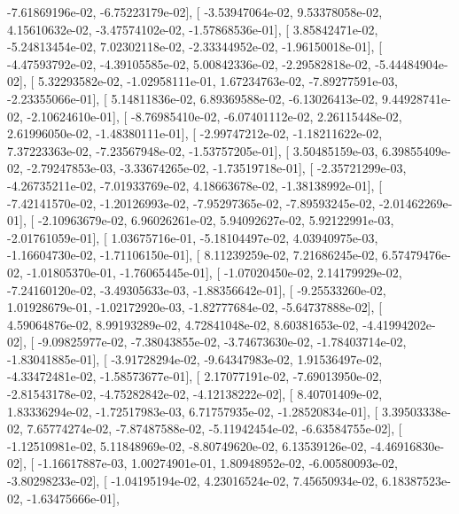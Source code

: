 \documentclass{article}
\begin{document}
         -7.61869196e-02,  -6.75223179e-02],
       [ -3.53947064e-02,   9.53378058e-02,   4.15610632e-02,
         -3.47574102e-02,  -1.57868536e-01],
       [  3.85842471e-02,  -5.24813454e-02,   7.02302118e-02,
         -2.33344952e-02,  -1.96150018e-01],
       [ -4.47593792e-02,  -4.39105585e-02,   5.00842336e-02,
         -2.29582818e-02,  -5.44484904e-02],
       [  5.32293582e-02,  -1.02958111e-01,   1.67234763e-02,
         -7.89277591e-03,  -2.23355066e-01],
       [  5.14811836e-02,   6.89369588e-02,  -6.13026413e-02,
          9.44928741e-02,  -2.10624610e-01],
       [ -8.76985410e-02,  -6.07401112e-02,   2.26115448e-02,
          2.61996050e-02,  -1.48380111e-01],
       [ -2.99747212e-02,  -1.18211622e-02,   7.37223363e-02,
         -7.23567948e-02,  -1.53757205e-01],
       [  3.50485159e-03,   6.39855409e-02,  -2.79247853e-03,
         -3.33674265e-02,  -1.73519718e-01],
       [ -2.35721299e-03,  -4.26735211e-02,  -7.01933769e-02,
          4.18663678e-02,  -1.38138992e-01],
       [ -7.42141570e-02,  -1.20126993e-02,  -7.95297365e-02,
         -7.89593245e-02,  -2.01462269e-01],
       [ -2.10963679e-02,   6.96026261e-02,   5.94092627e-02,
          5.92122991e-03,  -2.01761059e-01],
       [  1.03675716e-01,  -5.18104497e-02,   4.03940975e-03,
         -1.16604730e-02,  -1.71106150e-01],
       [  8.11239259e-02,   7.21686245e-02,   6.57479476e-02,
         -1.01805370e-01,  -1.76065445e-01],
       [ -1.07020450e-02,   2.14179929e-02,  -7.24160120e-02,
         -3.49305633e-03,  -1.88356642e-01],
       [ -9.25533260e-02,   1.01928679e-01,  -1.02172920e-03,
         -1.82777684e-02,  -5.64737888e-02],
       [  4.59064876e-02,   8.99193289e-02,   4.72841048e-02,
          8.60381653e-02,  -4.41994202e-02],
       [ -9.09825977e-02,  -7.38043855e-02,  -3.74673630e-02,
         -1.78403714e-02,  -1.83041885e-01],
       [ -3.91728294e-02,  -9.64347983e-02,   1.91536497e-02,
         -4.33472481e-02,  -1.58573677e-01],
       [  2.17077191e-02,  -7.69013950e-02,  -2.81543178e-02,
         -4.75282842e-02,  -4.12138222e-02],
       [  8.40701409e-02,   1.83336294e-02,  -1.72517983e-03,
          6.71757935e-02,  -1.28520834e-01],
       [  3.39503338e-02,   7.65774274e-02,  -7.87487588e-02,
         -5.11942454e-02,  -6.63584755e-02],
       [ -1.12510981e-02,   5.11848969e-02,  -8.80749620e-02,
          6.13539126e-02,  -4.46916830e-02],
       [ -1.16617887e-03,   1.00274901e-01,   1.80948952e-02,
         -6.00580093e-02,  -3.80298233e-02],
       [ -1.04195194e-02,   4.23016524e-02,   7.45650934e-02,
          6.18387523e-02,  -1.63475666e-01],
\end{document}

